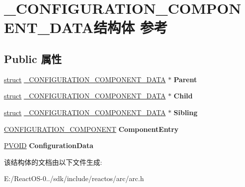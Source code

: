 \hypertarget{struct___c_o_n_f_i_g_u_r_a_t_i_o_n___c_o_m_p_o_n_e_n_t___d_a_t_a}{}\section{\+\_\+\+C\+O\+N\+F\+I\+G\+U\+R\+A\+T\+I\+O\+N\+\_\+\+C\+O\+M\+P\+O\+N\+E\+N\+T\+\_\+\+D\+A\+T\+A结构体 参考}
\label{struct___c_o_n_f_i_g_u_r_a_t_i_o_n___c_o_m_p_o_n_e_n_t___d_a_t_a}
\subsection*{Public 属性}
\begin{DoxyCompactItemize}
\item 
\mbox{\label{struct___c_o_n_f_i_g_u_r_a_t_i_o_n___c_o_m_p_o_n_e_n_t___d_a_t_a_abfedde34ed184a7212984cfdaf960c37}} 
\hyperlink{interfacestruct}{struct} \hyperlink{struct___c_o_n_f_i_g_u_r_a_t_i_o_n___c_o_m_p_o_n_e_n_t___d_a_t_a}{\+\_\+\+C\+O\+N\+F\+I\+G\+U\+R\+A\+T\+I\+O\+N\+\_\+\+C\+O\+M\+P\+O\+N\+E\+N\+T\+\_\+\+D\+A\+TA} $\ast$ {\bfseries Parent}
\item 
\mbox{\label{struct___c_o_n_f_i_g_u_r_a_t_i_o_n___c_o_m_p_o_n_e_n_t___d_a_t_a_ab0565d37e73f093aec02a1e846a6a388}} 
\hyperlink{interfacestruct}{struct} \hyperlink{struct___c_o_n_f_i_g_u_r_a_t_i_o_n___c_o_m_p_o_n_e_n_t___d_a_t_a}{\+\_\+\+C\+O\+N\+F\+I\+G\+U\+R\+A\+T\+I\+O\+N\+\_\+\+C\+O\+M\+P\+O\+N\+E\+N\+T\+\_\+\+D\+A\+TA} $\ast$ {\bfseries Child}
\item 
\mbox{\label{struct___c_o_n_f_i_g_u_r_a_t_i_o_n___c_o_m_p_o_n_e_n_t___d_a_t_a_a4db55bda691f020fd417adb07a762ae5}} 
\hyperlink{interfacestruct}{struct} \hyperlink{struct___c_o_n_f_i_g_u_r_a_t_i_o_n___c_o_m_p_o_n_e_n_t___d_a_t_a}{\+\_\+\+C\+O\+N\+F\+I\+G\+U\+R\+A\+T\+I\+O\+N\+\_\+\+C\+O\+M\+P\+O\+N\+E\+N\+T\+\_\+\+D\+A\+TA} $\ast$ {\bfseries Sibling}
\item 
\mbox{\label{struct___c_o_n_f_i_g_u_r_a_t_i_o_n___c_o_m_p_o_n_e_n_t___d_a_t_a_a061d55ba74758d2369eea1f328262e90}} 
\hyperlink{struct___c_o_n_f_i_g_u_r_a_t_i_o_n___c_o_m_p_o_n_e_n_t}{C\+O\+N\+F\+I\+G\+U\+R\+A\+T\+I\+O\+N\+\_\+\+C\+O\+M\+P\+O\+N\+E\+NT} {\bfseries Component\+Entry}
\item 
\mbox{\label{struct___c_o_n_f_i_g_u_r_a_t_i_o_n___c_o_m_p_o_n_e_n_t___d_a_t_a_ade694bb669ab348ac0180c8d06e047ff}} 
\hyperlink{interfacevoid}{P\+V\+O\+ID} {\bfseries Configuration\+Data}
\end{DoxyCompactItemize}


该结构体的文档由以下文件生成\+:\begin{DoxyCompactItemize}
\item 
E\+:/\+React\+O\+S-\/0../sdk/include/reactos/arc/arc.\+h\end{DoxyCompactItemize}
